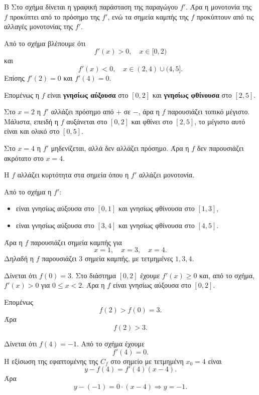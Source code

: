 

\begin{thema}{Β}
Στο σχήμα δίνεται η γραφική παράσταση της παραγώγου $f'$. Άρα η μονοτονία της $f$ προκύπτει από το πρόσημο της $f'$, ενώ τα σημεία καμπής της $f$ προκύπτουν από τις αλλαγές μονοτονίας της $f'$.

\begin{erwthma}
\item Από το σχήμα βλέπουμε ότι
\[
f'(x)>0,\quad x\in[0,2)
\]
και
\[
f'(x)<0,\quad x\in(2,4)\cup(4,5].
\]
Επίσης $f'(2)=0$ και $f'(4)=0$.

Επομένως η $f$ είναι \textbf{γνησίως αύξουσα} στο $[0,2]$ και \textbf{γνησίως φθίνουσα} στο $[2,5]$.

Στο $x=2$ η $f'$ αλλάζει πρόσημο από $+$ σε $-$, άρα η $f$ παρουσιάζει τοπικό μέγιστο. Μάλιστα, επειδή η $f$ αυξάνεται στο $[0,2]$ και φθίνει στο $[2,5]$, το μέγιστο αυτό είναι και ολικό στο $[0,5]$.

Στο $x=4$ η $f'$ μηδενίζεται, αλλά δεν αλλάζει πρόσημο. Άρα η $f$ δεν παρουσιάζει ακρότατο στο $x=4$.

\item Η $f$ αλλάζει κυρτότητα στα σημεία όπου η $f'$ αλλάζει μονοτονία.

Από το σχήμα η $f'$:
\begin{itemize}
\item είναι γνησίως αύξουσα στο $[0,1]$ και γνησίως φθίνουσα στο $[1,3]$,
\item είναι γνησίως αύξουσα στο $[3,4]$ και γνησίως φθίνουσα στο $[4,5]$.
\end{itemize}
Άρα η $f$ παρουσιάζει σημεία καμπής για
\[
x=1,\quad x=3,\quad x=4.
\]
Δηλαδή η $f$ παρουσιάζει $3$ σημεία καμπής, με τετμημένες $1,3,4$.

\item Δίνεται ότι $f(0)=3$. Στο διάστημα $[0,2]$ έχουμε $f'(x)\geq 0$ και, από το σχήμα, $f'(x)>0$ για $0\leq x<2$. Άρα η $f$ είναι γνησίως αύξουσα στο $[0,2]$.

Επομένως
\[
f(2)>f(0)=3.
\]
Άρα
\[
f(2)>3.
\]

\item Δίνεται ότι $f(4)=-1$. Από το σχήμα έχουμε
\[
f'(4)=0.
\]
Η εξίσωση της εφαπτομένης της $C_f$ στο σημείο με τετμημένη $x_0=4$ είναι
\[
y-f(4)=f'(4)(x-4).
\]
Άρα
\[
y-(-1)=0\cdot(x-4)\Rightarrow y=-1.
\]
\end{erwthma}
\end{thema}

